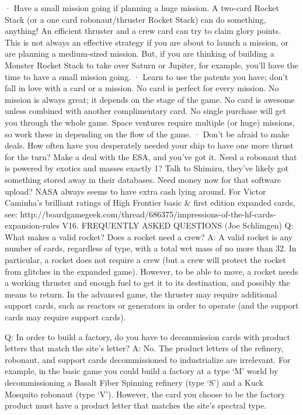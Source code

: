 \documentclass[a4paper]{book}
\begin{document}
·       Have a small mission going if planning a huge mission.
A two-card Rocket Stack (or a one card robonaut/thruster Rocket Stack) can do something, anything! An efficient thruster and a crew card can try to claim glory points. This is not always an effective strategy if you are about to launch a mission, or are planning a medium-sized mission. But, if you are thinking of building a Monster Rocket Stack to take over Saturn or Jupiter, for example, you'll have the time to have a small mission going.
·       Learn to use the patents you have; don't fall in love with a card or a mission.
No card is perfect for every mission. No mission is always great; it depends on the stage of the game. No card is awesome unless combined with another complimentary card. No single purchase will get you through the whole game.
Space ventures require multiple (or huge) missions, so work these in depending on the flow of the game.
·        Don't be afraid to make deals.
How often have you desperately needed your ship to have one more thrust for the turn? Make a deal with the ESA, and you've got it. Need a robonaut that is powered by exotics and masses exactly 1? Talk to Shimizu, they've likely got something stored away in their databases. Need money now for that software upload? NASA always seems to have extra cash lying around.
For Victor Caminha’s brilliant ratings of High Frontier basic \& first edition expanded cards, see:
http://boardgamegeek.com/thread/686375/impressions-of-the-hf-cards-expansion-rules
V16. FREQUENTLY ASKED QUESTIONS (Joe Schlimgen)
Q: What makes a valid rocket? Does a rocket need a crew?
A: A valid rocket is any number of cards, regardless of type, with a total wet mass of no more than 32. In particular, a rocket does not require a crew (but a crew will protect the rocket from glitches in the expanded game). However, to be able to move, a rocket needs a working thruster and enough fuel to get it to its destination, and possibly the means to return. In the advanced game, the thruster may require additional support cards, such as reactors or generators in order to operate (and the support cards may require support cards).

Q: In order to build a factory, do you have to decommission cards with product letters that match the site's letter?
A: No. The product letters of the refinery, robonaut, and support cards decommissioned to industrialize are irrelevant. For example, in the basic game you could build a factory at a type `M' world by decommissioning a Basalt Fiber Spinning refinery (type `S') and a Kuck Mosquito robonaut (type `V'). However, the card you choose to be the factory product must have a product letter that matches the site's spectral type.
\end{document}

